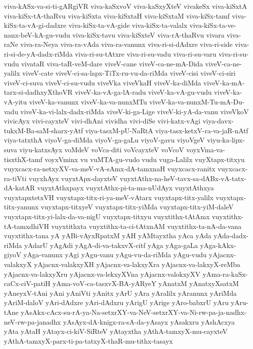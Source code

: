 {viva-kASx-va-si-ti-gARgiVR
viva-kaSxvoV
viva-kaSxyXteV
vivakeSx
viva-kiSxtA
viva-kiSx-tA-thaRvu
viva-kiSxta
viva-kiSxtaH
viva-kiSxtaM
viva-kiSx-tamf
viva-kiSx-ta-vA-gi-dadxre
viva-kiSx-ta-vA-gide
viva-kiSx-ta-valalx
viva-kiSx-ta-ve-nanx-beV-kA-gu-vudu
viva-kiSx-tavu
viva-kiSxteV
viva-rA-thaRvu
vivara
viva-raNe
viva-ra-Neya
viva-ra-vAda
viva-ra-vanunx
viva-ri-si-dAdxre
viva-ri-side
viva-ri-si-de-yA-dadx-riMda
viva-ri-su-tAtxre
viva-ri-su-vadu
viva-ri-su-varu
viva-ri-su-vudu
vivataR
viva-taR-veM-dare
viveV-cane
viveV-ca-ne-mA-Dida
viveV-ca-ne-yalilx
viveV-cate
viveV-ci-sa-lapx-TiTx-ru-vu-da-riMda
viveV-cisi
viveV-ci-siri
viveV-ci-suva
viveV-ci-su-vudu
viveVka
viveVkaH
viveV-ka-diMda
viveV-ka-mA-tarx-si-dadhxyXthoVR
viveV-ka-vA-ga-lA-radu
viveV-ka-vA-gu-vudu
viveV-ka-vA-yitu
viveV-ka-vanunx
viveV-ka-va-nunxMTu
viveV-ka-va-nunxM-Tu-mA-Du-vadu
viveV-ka-vi-lalx-dadx-riMda
viveV-ki-ga-Lige
viveV-ki-yA-da-vanu
viveVkoV
vivicAyx
vivi-cayxteV
vivi-dhAni
vividha
vivi-diSe
vivi-katx-vAgi
viya-davx-tukxM-Ba-saM-sharx-yAtf
viya-tasxM-pU-NaRtA
viya-tasx-ketxV-ra-va-jaR-nAtf
viya-tatxthA
viyoV-ga-diMda
viyoV-ga-gaLu
viyoV-gavu
viyoVgeV
viyu-ka-lipx-suva
viyu-katxsAyx
voMdeV
voVca-diti
voVcayxteV
voVcoV
voyxVma-va-tisxthX-tamf
voyxVminx
vu
vuMTA-gu-vudo
vudu
vuga-Lalilx
vuyXtapx-titxyu
vuyxcacx-ra-netxyXV-va-meV-vA-sAmx-dA-tamxnaH
vuyxcacx-ranitx
vuyxcacx-ra-tiVti
vuyxhAyx
vuyxtApx-dayxteV
vuyxtAthx-na-heV-tavx-sa-dABx-vA-tatx-dA-katAR
vuyxtAthxpayx
vuyxtAthx-pi-ta-ma-nUdAyx
vuyxtAthxya
vuyxtapxtetxVH
vuyxtapx-titx-ri-ya-meV-vAtarx
vuyxtapx-titx-yalilx
vuyxtapx-titx-yanunx
vuyxtapx-titxyeV
vuyxtapx-titx-yiMda
vuyxtapx-titx-yiM-daleV
vuyxtapx-titx-yi-lalx-da-va-nigU
vuyxtapx-titxyu
vuyxtithx-tAtAmx
vuyxtithx-tA-tamxdhiVH
vuyxtithxta
vuyxtithx-ta-ci-tAtxnAM
vuyxtithx-ta-nA-da-vana
vuyxtithx-tana
yA
yABi-vAyxRpatxM
yAH
yAMtayxtha
yAca
yAda
yAda-dadx-riMda
yAdarU
yAgAdi
yAgA-di-va-takxvX-citf
yAga
yAga-gaLa
yAga-kAkx-giyoV
yAga-vanunx
yAgi
yAgu-vanu
yAgu-vu-da-riMda
yAgu-vudu
yAjacnx-valakxyX
yAjacnx-valakxyXH
yAjacnx-va-lakxyXra
yAjacnx-va-lakxyX-reMba
yAjacnx-va-lakxyXru
yAjacnx-va-lekxyXVna
yAjacnx-valokxyXV
yAma-ra-kaSx-caCx-ciV-patiH
yAma-voV-ca-tasxvX-BA-yARyeY
yAnatxM
yAnatxyXsatxM
yAneyxV-tAni
yAni
yAniVti
yAnitx
yArU
yAra
yAralilx
yAranunx
yAriMda
yAriM-daloV
yAri-dAdxre
yAri-dAdxru
yArigU
yArige
yAro-babxrU
yAru
yAru-tAne
yAsAkx-cAcx-su-rA-ya-Na-setxrXY-va-NeV-setxrXY-va-Ni-rw-pa-ja-nadhx-neV-rw-pa-janadhx
yAsAyx-dA-knigx-ra-sA-da-yAsayx
yAsakxru
yAshAcxya
yAta
yAtaH
yAtayx-ci-kiV-SiRteV
yAtayxtha
yAthA-tamxyX-mu-cayxteV
yAthA-tamxyX-parx-ti-pa-tatxyX-thaR-mu-tithx-tasayx
}
